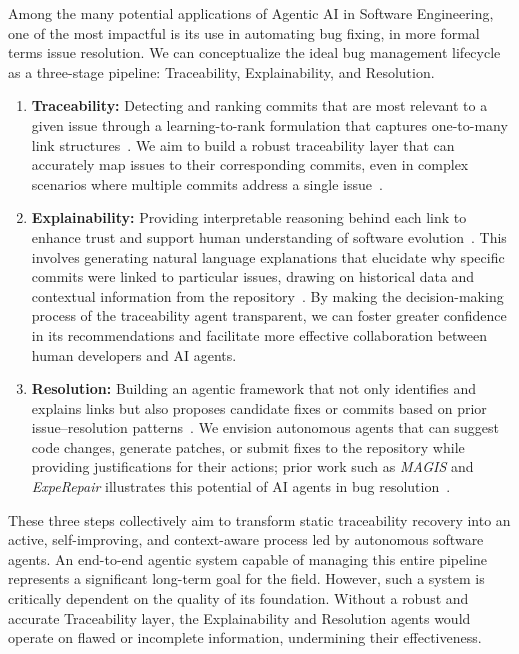 Among the many potential applications of Agentic AI in Software Engineering, one of the most impactful is its use in automating bug fixing, in more formal terms issue resolution. We can conceptualize the ideal bug management lifecycle as a three-stage pipeline: Traceability, Explainability, and Resolution.

\begin{enumerate}
    \item \textbf{Traceability:} Detecting and ranking commits that are most relevant to a given issue through a learning-to-rank formulation that captures one-to-many link structures~\cite{r11,r7,r17}. We aim to build a robust traceability layer that can accurately map issues to their corresponding commits, even in complex scenarios where multiple commits address a single issue~\cite{r21}.

    \item \textbf{Explainability:} Providing interpretable reasoning behind each link to enhance trust and support human understanding of software evolution~\cite{r45}. This involves generating natural language explanations that elucidate why specific commits were linked to particular issues, drawing on historical data and contextual information from the repository~\cite{r7}. By making the decision-making process of the traceability agent transparent, we can foster greater confidence in its recommendations and facilitate more effective collaboration between human developers and AI agents.

    \item \textbf{Resolution:} Building an agentic framework that not only identifies and explains links but also proposes candidate fixes or commits based on prior issue–resolution patterns~\cite{r89,r90}. We envision autonomous agents that can suggest code changes, generate patches, or submit fixes to the repository while providing justifications for their actions; prior work such as \emph{MAGIS} and \emph{ExpeRepair} illustrates this potential of AI agents in bug resolution~\cite{magis,mu2025expeRepair}.
\end{enumerate}

\noindent
These three steps collectively aim to transform static traceability recovery into an active, self-improving, and context-aware process led by autonomous software agents. An end-to-end agentic system capable of managing this entire pipeline represents a significant long-term goal for the field. However, such a system is critically dependent on the quality of its foundation. Without a robust and accurate Traceability layer, the Explainability and Resolution agents would operate on flawed or incomplete information, undermining their effectiveness.\\


